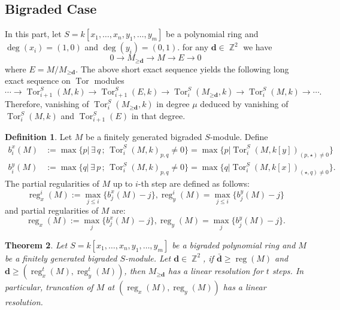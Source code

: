 \documentclass[11pt]{amsart}
\DeclareMathOperator{\reg}{reg}
\DeclareMathOperator{\tor}{Tor}
\DeclareMathOperator{\Tor}{Tor}
\DeclareMathOperator{\Z}{\mathbb{Z}}
\newtheorem{thm}{Theorem}[section]
\theoremstyle{definition}
\newtheorem{dfn}[thm]{Definition}
\begin{document}
\subsection*{Bigraded Case} In this part, let $S=k[x_1,\dots,x_n,y_1,\dots,y_m]$ be a polynomial ring and $\deg(x_i)=(1,0)$ and $\deg(y_i)=(0,1)$.   for any $\textbf{d}\in \Z^2$ we have
$$
0\rightarrow M_{\geq \textbf{d}} \rightarrow M\rightarrow E\rightarrow 0
$$
where $E= M/M_{\geq \textbf{d}}$. The above short exact sequence yields the following long exact sequence on $\Tor$ modules
$$
\cdots \rightarrow \Tor_{i+1}^S(M,k)\rightarrow \Tor_{i+1}^S(E,k)\rightarrow 
\Tor_i^S({M_{\geq \textbf{d}}},k)\rightarrow \Tor_i^S(M,k)\rightarrow \cdots .
$$
Therefore, vanishing of $\tor_i^S(M_{\geq \textbf{d}},k)$ in degree $\mu$ deduced by vanishing of $\tor_i^S(M,k)$ and $\tor_{i+1}^S(E)$ in that degree. 
\begin{dfn}
Let $M$ be a finitely generated bigraded $S$-module. Define
\begin{align*}
b_i^x(M) &:= \max \lbrace p \vert \, \exists \,q \,;\,  \tor_{i}^S(M,k)_{p,q}\neq 0\rbrace = \max \lbrace p \vert \tor_i^S(M, k[y])_{(p,\star)\neq 0}\rbrace\\
b_i^y(M) &:= \max \lbrace q \vert \, \exists \,p \,;\, \tor_{i}^S(M,k)_{p,q}\neq 0\rbrace= \max \lbrace q \vert \tor_i^S(M, k[x])_{(\star,q)\neq 0}\rbrace.
\end{align*}
The partial regularities of $M$ up to $i$-th step are defined as follows:
$$
\reg^i _x(M) := \max_{j\leq i} \lbrace b_j^x(M)-j\rbrace, \reg^i_y(M) = \max_{j\leq i}\lbrace b_j^y(M)-j\rbrace
$$
and  partial regularities of $M$ are:
$$
\reg _x(M) := \max_{j} \lbrace b_j^x(M)-j\rbrace, \reg_y(M) = \max_{j}\lbrace b_j^y(M)-j\rbrace.
$$
\end{dfn}
\begin{thm}\label{r=2}
Let $S=k[x_1,\dots,x_n,y_1,\dots, y_m]$ be a bigraded polynomial ring and $M$ be a finitely generated bigraded $S$-module.  Let $\textbf{d}\in \Z^2$, if $\bar{\textbf{d}}\geq \reg(M)$ and $ \textbf{d} \geq  (\reg^t_x(M),\reg^t_y(M))$, then  
$M_{\geq \textbf{d}}$ has a linear resolution for $t$ steps. In particular, truncation of $M$ at $(\reg_x(M),\reg_y(M))$ has a linear resolution.
\end{thm}
\end{document}
